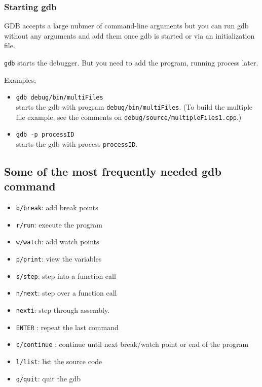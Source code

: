 \subsubsection{Starting gdb}
GDB accepts a large nubmer of command-line arguments but you can run gdb without any arguments and add them once gdb is started or via an initialization file.


\texttt{gdb} starts the debugger. But you need to add the program, running process later.

Examples;
\begin{itemize}

  \item \texttt{gdb debug/bin/multiFiles} \\
    starts the gdb with program \texttt{debug/bin/multiFiles}.
    (To build the multiple file example, see the comments on \texttt{debug/source/multipleFiles1.cpp}.)


  \item \texttt{gdb -p processID} \\
    starts the gdb with process \texttt{processID}.


\end{itemize}

\subsection{Some of the most frequently needed gdb command}

\begin{itemize}
  \item \texttt{b/break}: add break points
  \item \texttt{r/run}: execute the program
  \item \texttt{w/watch}: add watch points
  \item \texttt{p/print}: view the variables
  \item \texttt{s/step}: step into a function call
  \item \texttt{n/next}: step over a function call
  \item \texttt{nexti}: step through assembly.
  \item \texttt{ENTER} : repeat the last command
  \item \texttt{c/continue} : continue until next break/watch point or end of the program
  \item \texttt{l/list}: list the source code
  \item \texttt{q/quit}: quit the gdb
\end{itemize}


